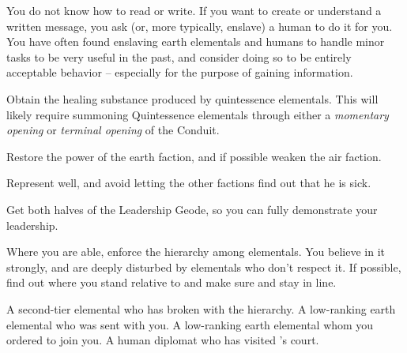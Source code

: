 \documentclass[char]{elementals}
\begin{document}
You do not know how to read or write.  If you want to create or understand a written message, you ask (or, more typically, enslave) a human to do it for you.  You have often found enslaving earth elementals and humans to handle minor tasks to be very useful in the past, and consider doing so to be entirely acceptable behavior -- especially for the purpose of gaining information.

\begin{itemz}[Goals]
	\item Obtain the healing substance produced by quintessence elementals. This will likely require summoning Quintessence elementals through either a \emph{momentary opening} or \emph{terminal opening} of the Conduit.
	\item Restore the power of the earth faction, and if possible weaken the air faction.
	\item Represent \cEarthKing{} well, and avoid letting the other factions find out that he is sick.
        \item Get both halves of the Leadership Geode, so you can fully demonstrate your leadership.
	\item Where you are able, enforce the hierarchy among elementals.  You believe in it strongly, and are deeply disturbed by elementals who don't respect it.  If possible, find out where you stand relative to \cRogue{} and make sure \cMinion{} and \cMiniEarth{} stay in line.
\end{itemz}
 
\begin{contacts}
	\contact{\cRogue{}}  A second-tier elemental who has broken with the hierarchy.
	\contact{\cMinion{}}  A low-ranking earth elemental who was sent with you. 
  \contact{\cMiniEarth{}}  A low-ranking earth elemental whom you ordered to join you.
  \contact{\cAvatar{}}  A human diplomat who has visited \cEarthKing{}'s court.
\end{contacts} 
\end{document}
